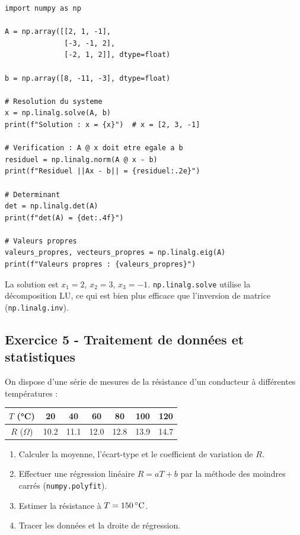 \documentclass[12pt,a4paper]{article}
\begin{document}
\begin{boitecorrige}
\begin{lstlisting}
import numpy as np

A = np.array([[2, 1, -1],
              [-3, -1, 2],
              [-2, 1, 2]], dtype=float)

b = np.array([8, -11, -3], dtype=float)

# Resolution du systeme
x = np.linalg.solve(A, b)
print(f"Solution : x = {x}")  # x = [2, 3, -1]

# Verification : A @ x doit etre egale a b
residuel = np.linalg.norm(A @ x - b)
print(f"Residuel ||Ax - b|| = {residuel:.2e}")

# Determinant
det = np.linalg.det(A)
print(f"det(A) = {det:.4f}")

# Valeurs propres
valeurs_propres, vecteurs_propres = np.linalg.eig(A)
print(f"Valeurs propres : {valeurs_propres}")
\end{lstlisting}

La solution est $x_1=2$, $x_2=3$, $x_3=-1$. \texttt{np.linalg.solve} utilise la décomposition LU, ce qui est bien plus efficace que l'inversion de matrice (\texttt{np.linalg.inv}).
\end{boitecorrige}

\subsection*{Exercice 5 - Traitement de données et statistiques \niveau{\difficile}}

\begin{boiteexercice}
On dispose d'une série de mesures de la résistance d'un conducteur à différentes températures :

\begin{center}
\begin{tabular}{c|cccccc}
$T$ (°C) & 20 & 40 & 60 & 80 & 100 & 120\\
\hline
$R$ ($\Omega$) & 10.2 & 11.1 & 12.0 & 12.8 & 13.9 & 14.7
\end{tabular}
\end{center}

\begin{enumerate}
  \item Calculer la moyenne, l'écart-type et le coefficient de variation de $R$.
  \item Effectuer une régression linéaire $R = aT + b$ par la méthode des moindres carrés (\texttt{numpy.polyfit}).
  \item Estimer la résistance à $T = \num{150}\,{}^\circ\text{C}$.
  \item Tracer les données et la droite de régression.
\end{enumerate}
\end{boiteexercice}
\end{document}
